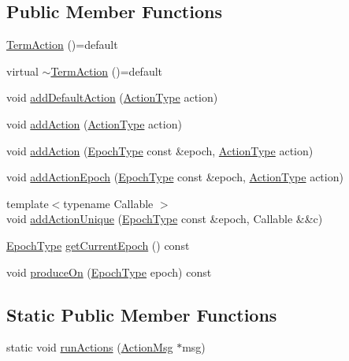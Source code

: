 \subsection*{Public Member Functions}
\begin{DoxyCompactItemize}
\item 
\hyperlink{structvt_1_1term_1_1_term_action_ac0b0f4271452cfbea674c6a7c4f50a4b}{Term\+Action} ()=default
\item 
virtual \hyperlink{structvt_1_1term_1_1_term_action_aeada4a2bd60a9b44be986b603ddac4a5}{$\sim$\+Term\+Action} ()=default
\item 
void \hyperlink{structvt_1_1term_1_1_term_action_a9e9e174482720b4886ea4e8c38ead0d7}{add\+Default\+Action} (\hyperlink{namespacevt_ae0a5a7b18cc99d7b732cb4d44f46b0f3}{Action\+Type} action)
\item 
void \hyperlink{structvt_1_1term_1_1_term_action_a1227042cb4eb38937fb8ed34bcbdf998}{add\+Action} (\hyperlink{namespacevt_ae0a5a7b18cc99d7b732cb4d44f46b0f3}{Action\+Type} action)
\item 
void \hyperlink{structvt_1_1term_1_1_term_action_a15b79357805676e1ff2f880b02fd4061}{add\+Action} (\hyperlink{namespacevt_a81d11b28122d43bf9834577e4a06440f}{Epoch\+Type} const \&epoch, \hyperlink{namespacevt_ae0a5a7b18cc99d7b732cb4d44f46b0f3}{Action\+Type} action)
\item 
void \hyperlink{structvt_1_1term_1_1_term_action_a2429a48171da578d25d7672486a24b51}{add\+Action\+Epoch} (\hyperlink{namespacevt_a81d11b28122d43bf9834577e4a06440f}{Epoch\+Type} const \&epoch, \hyperlink{namespacevt_ae0a5a7b18cc99d7b732cb4d44f46b0f3}{Action\+Type} action)
\item 
{\footnotesize template$<$typename Callable $>$ }\\void \hyperlink{structvt_1_1term_1_1_term_action_a3ccd1689f56ab62821cfa6b1e65fc60b}{add\+Action\+Unique} (\hyperlink{namespacevt_a81d11b28122d43bf9834577e4a06440f}{Epoch\+Type} const \&epoch, Callable \&\&c)
\item 
\hyperlink{namespacevt_a81d11b28122d43bf9834577e4a06440f}{Epoch\+Type} \hyperlink{structvt_1_1term_1_1_term_action_a39d9b950c0a4820a424dc2d4dad4d38a}{get\+Current\+Epoch} () const
\item 
void \hyperlink{structvt_1_1term_1_1_term_action_a7022e4c4db4cffc376f8c228b32deee8}{produce\+On} (\hyperlink{namespacevt_a81d11b28122d43bf9834577e4a06440f}{Epoch\+Type} epoch) const
\end{DoxyCompactItemize}
\subsection*{Static Public Member Functions}
\begin{DoxyCompactItemize}
\item 
static void \hyperlink{structvt_1_1term_1_1_term_action_a13f4ee69a6e01f65de03320904737c64}{run\+Actions} (\hyperlink{structvt_1_1term_1_1_term_action_1_1_action_msg}{Action\+Msg} $\ast$msg)
\end{DoxyCompactItemize}
